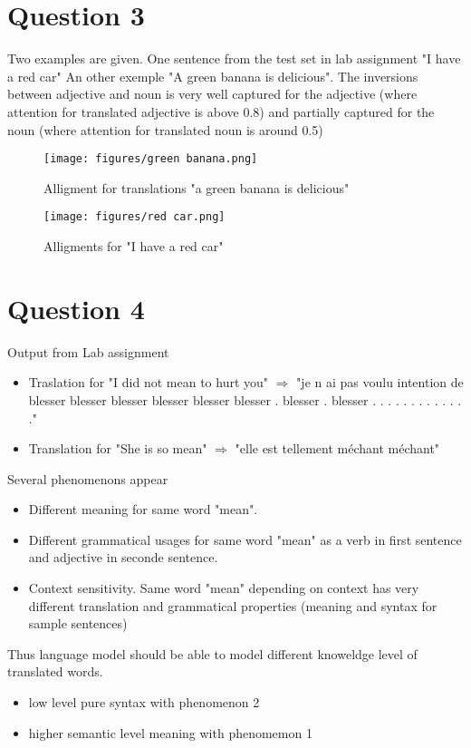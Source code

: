 \documentclass[a4paper]{article}
\begin{document}
\section{Question 3}

Two examples are given. One sentence from the test set in lab assignment "I have a red car"
An other exemple "A green banana is delicious". The inversions between adjective and noun is very well captured for the adjective (where attention for translated adjective is above 0.8) and partially captured for the noun  (where attention for translated noun is around 0.5) 
\begin{figure}[p]
\texttt{[image: figures/green banana.png]}
\caption{Alligment for translations "a green banana is delicious"}
\end{figure}

\begin{figure}
\texttt{[image: figures/red car.png]}
\caption{Alligments for "I have a red car"}
\end{figure}

\section{Question 4}
Output from Lab assignment
\begin{itemize}
\item Traslation for "I did not mean to hurt you" $\Rightarrow$
"je n ai pas voulu intention de blesser blesser blesser blesser blesser blesser . blesser . blesser . . . . . . . . . . . . ."
\item  Translation for "She is so mean" $\Rightarrow$
"elle est tellement méchant méchant"
\end{itemize}


Several phenomenons appear
  


\begin{itemize}
\item Different meaning for same word "mean".
\item Different grammatical usages for same word "mean" as a verb in first sentence and adjective in seconde sentence.
\item Context sensitivity. Same word "mean" depending on context has very different translation and grammatical properties (meaning and syntax for sample sentences)
\end{itemize}


Thus language model should be able to model different knoweldge level of translated words. 
\begin{itemize}
\item low level pure syntax with phenomenon 2
\item higher semantic level meaning with phenomemon 1
\end{itemize}
\end{document}
